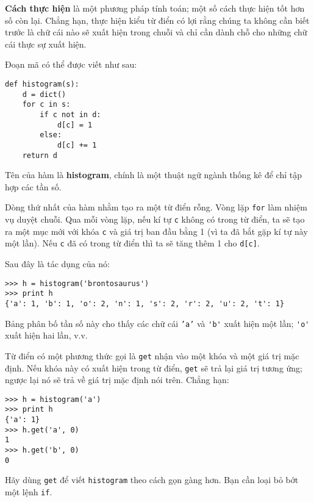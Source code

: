 \documentclass[11pt]{book}
\begin{document}
{\bf Cách thực hiện} là một phương pháp tính toán; một số
cách thực hiện tốt hơn số còn lại. Chẳng hạn, thực hiện kiểu 
từ điển có lợi rằng chúng ta không cần biết trước là chữ cái nào 
sẽ xuất hiện trong chuỗi và chỉ cần dành chỗ cho những chữ cái
thực sự xuất hiện.

Đoạn mã có thể được viết như sau:

\beforeverb
\begin{verbatim}
def histogram(s):
    d = dict()
    for c in s:
        if c not in d:
            d[c] = 1
        else:
            d[c] += 1
    return d
\end{verbatim}
\afterverb
%
Tên của hàm là {\bf histogram}, chính là một thuật ngữ ngành thống kê 
để chỉ tập hợp các tần số.


Dòng thứ nhất của hàm nhằm tạo ra một từ điển rỗng. Vòng lặp {\tt for} 
làm nhiệm vụ duyệt chuỗi. Qua mỗi vòng lặp, nếu kí tự  {\tt c} không có
trong từ điển, ta sẽ tạo ra một mục mới với khóa {\tt c} và giá trị ban đầu
bằng 1 (vì ta đã bắt gặp kí tự này một lần). Nếu {\tt c} đã có trong từ điển
thì ta sẽ tăng thêm 1 cho {\tt d[c]}.


Sau đây là tác dụng của nó:

\beforeverb
\begin{verbatim}
>>> h = histogram('brontosaurus')
>>> print h
{'a': 1, 'b': 1, 'o': 2, 'n': 1, 's': 2, 'r': 2, 'u': 2, 't': 1}
\end{verbatim}
\afterverb
%
Bảng phân bố tần số này cho thấy các chữ cái {\tt 'a'} và \verb"'b'"
xuất hiện một lần; \verb"'o'" xuất hiện hai lần, v.v.

\begin{ex}


Từ điển có một phương thức gọi là {\tt get} nhận vào một khóa và
một giá trị mặc định. Nếu khóa này có xuất hiện trong từ điển, 
{\tt get} sẽ trả lại giá trị tương ứng; ngược lại nó sẽ trả về
giá trị mặc định nói trên. Chẳng hạn:

\beforeverb
\begin{verbatim}
>>> h = histogram('a')
>>> print h
{'a': 1}
>>> h.get('a', 0)
1
>>> h.get('b', 0)
0
\end{verbatim}
\afterverb
%
Hãy dùng {\tt get} để viết {\tt histogram} theo cách gọn gàng hơn. 
Bạn cần loại bỏ bớt một lệnh {\tt if}.
\end{ex}
\end{document}
